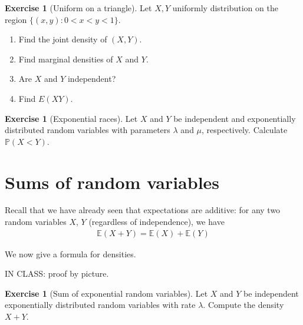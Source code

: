 \documentclass[11pt]{article}
\theoremstyle{definition}
\newtheorem{exercise}[]{Exercise}
\renewcommand{\P}{\mathbb{P}}
\newcommand{\E}{\mathbb{E}}
\begin{document}
\begin{exercise}[Uniform on a triangle]
Let $X, Y$ uniformly distribution on the region
$\{(x, y) : 0 < x < y < 1\}$.
\begin{enumerate}[label = (\alph*)]
  \item Find the joint density of $(X, Y)$.
  \item Find marginal densities of $X$ and $Y$.
  \item Are $X$ and $Y$ independent?
  \item Find $E(XY)$.
\end{enumerate}
\end{exercise}


\begin{exercise}[Exponential races]
Let $X$ and $Y$ be independent and exponentially
distributed random variables with parameters $\lambda$ and $\mu$, respectively. Calculate $\P(X<Y)$.
\end{exercise}

\section{Sums of random variables}

Recall that we have already seen that expectations are additive: for any two random variables $X$, $Y$
(regardless of independence), we have
\begin{align*}
  \E(X + Y) = \E(X) + \E(Y)
\end{align*}

We now give a formula for densities.


IN CLASS: proof by picture.

\begin{exercise}[Sum of exponential random variables]
Let $X$ and $Y$ be independent exponentially distributed
random variables with rate $\lambda$. Compute
the density $X + Y$.
\end{exercise}
\end{document}
